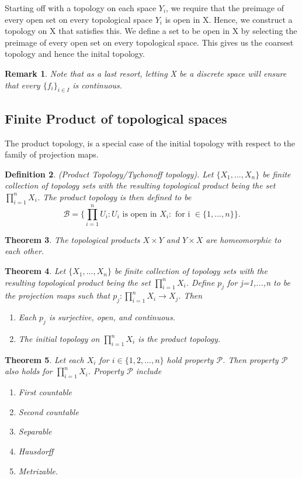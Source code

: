 \documentclass[twoside]{article}
\newcounter{lecnum}
\newtheorem{theorem}{Theorem}[lecnum]
\newtheorem{definition}[theorem]{Definition}
\newtheorem{remark}[theorem]{Remark}
\begin{document}
Starting off with a topology on each space $Y_i$, we require that the preimage of every open set on every topological space $Y_i$ is open in X. Hence, we construct a topology on X that satisfies this. We define a set to be open in X by selecting the preimage of every open set on every topological space. This gives us the coarsest topology and hence the inital topology.

\begin{remark}Note that as a last resort, letting X be a discrete space will ensure that every $\{f_i\}_{i \in I}$ is continuous.
\end{remark}

\subsection{Finite Product of topological spaces}

The product topology, is a special case of the initial topology with respect to the family of projection maps.

\begin{definition}(Product Topology/Tychonoff topology). Let $\{X_1,...,X_n\}$ be finite collection of topology sets with the resulting topological product being the set $\prod_{i=1}^nX_i$. The product topology is then defined to be 
$$
\mathcal{B} = \{\prod_{i=1}^nU_i: U_i \text{ is open in }X_i: \text{ for i } \in \{1,...,n\}\}.
$$
\end{definition}

\begin{theorem} The topological products $X \times Y$ and $Y \times X$ are homeomorphic to each other.
\end{theorem}

\begin{theorem}Let $\{X_1,...,X_n\}$ be finite collection of topology sets with the resulting topological product being the set $\prod_{i=1}^nX_i$. Define $p_j$ for j=1,...,n to be the projection maps such that $p_j: \prod_{i=1}^nX_i \rightarrow X_j$. Then 
\begin{enumerate}
\item Each $p_j$ is surjective, open, and continuous.
\item The initial topology on $\prod_{i=1}^nX_i$ is the product topology.
\end{enumerate}
\end{theorem}

\begin{theorem}
Let each $X_i$ for $i \in \{1,2,...,n\}$ hold property $\mathcal{P}$. Then property $\mathcal{P}$ also holds for $\prod_{i=1}^nX_i$. Property $\mathcal{P}$ include
\begin{enumerate}
\item First countable
\item Second countable
\item Separable
\item Hausdorff
\item Metrizable.
\end{enumerate}
\end{theorem}
\end{document}
